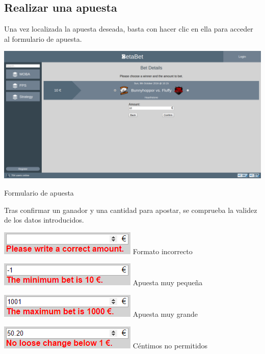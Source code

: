 \documentclass{article}
\begin{document}
\subsection{Realizar una apuesta}
Una vez localizada la apuesta deseada, basta con hacer clic en ella para acceder al formulario de apuesta.
\smallbreak
\begin{minipage}{\linewidth}
    \centering
    \captionsetup{type=figure}
    \includegraphics[width=\linewidth]{fig5}
    \caption{Formulario de apuesta}
    \label{fig:fig5}
\end{minipage}
\smallbreak
Tras confirmar un ganador y una cantidad para apostar, se comprueba la validez de los datos introducidos.
\begin{multicols}{4}
    \begin{center}
        \includegraphics[width=.975\linewidth]{bet1}
        Formato incorrecto
    \end{center}
    \columnbreak
    \begin{center}
        \includegraphics[width=.975\linewidth]{bet2}
        Apuesta muy pequeña
    \end{center}
    \columnbreak
    \begin{center}
        \includegraphics[width=.975\linewidth]{bet3}
        Apuesta muy grande
    \end{center}
    \columnbreak
    \begin{center}
        \includegraphics[width=.975\linewidth]{bet4}
        Céntimos no permitidos
    \end{center}
\end{multicols}
\end{document}
